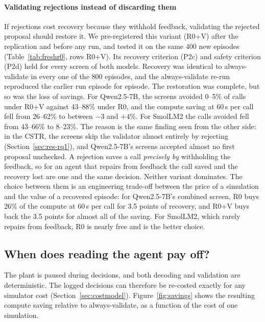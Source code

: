 \paragraph{Validating rejections instead of discarding them} If rejections cost recovery because they withhold
feedback, validating the rejected proposal should restore it. We pre-registered this variant (R0+V) after the
replication and before any run, and tested it on the same 400 new episodes (Table~\ref{tab:freshr0}, rows R0+V).
Its recovery criterion (P2c) and safety criterion (P2d) held for every screen of both models. Recovery was
identical to always-validate in every one of the 800 episodes, and the always-validate re-run reproduced the
earlier run episode for episode. The restoration was complete, but so was the loss of savings. For Qwen2.5-7B,
the screens avoided 0--5\% of calls under R0+V against 43--88\% under R0, and the compute saving at 60\,s per call
fell from 26--62\% to between $-3$ and $+4$\%. For SmolLM2 the calls avoided fell from 43--66\% to 8--23\%. The
reason is the same finding seen from the other side: in the CSTR, the screens skip the validator almost entirely
by rejecting (Section~\ref{sec:res-rq1}), and Qwen2.5-7B's screens accepted almost no first proposal unchecked.
A rejection saves a call \emph{precisely by} withholding the feedback, so for an agent that repairs from feedback
the call saved and the recovery lost are one and the same decision. Neither variant dominates. The choice between
them is an engineering trade-off between the price of a simulation and the value of a recovered episode: for
Qwen2.5-7B's combined screen, R0 buys 26\% of the compute at 60\,s per call for 3.5 points of recovery, and R0+V
buys back the 3.5 points for almost all of the saving. For SmolLM2, which rarely repairs from feedback, R0 is
nearly free and is the better choice.

\subsection{When does reading the agent pay off?}


The plant is paused during decisions, and both decoding and validation are deterministic. The logged decisions can
therefore be re-costed exactly for any simulator cost (Section~\ref{sec:costmodel}). Figure~\ref{fig:savings}
shows the resulting compute saving relative to always-validate, as a function of the cost of one simulation.

